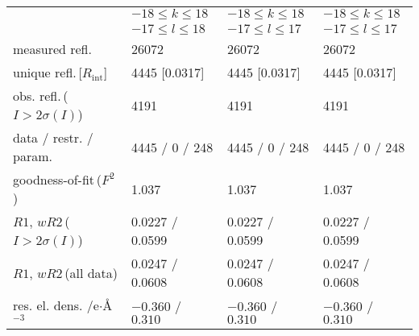 \documentclass[a4paper,landscape]{scrartcl}
\begin{document}
\begin{table}[ht]
\begin{tabular}{llll}
 & $-18\leq k \leq18$ & $-18\leq k \leq18$ & $-18\leq k \leq18$ \\
 & $-17\leq l \leq18$ & $-17\leq l \leq17$ & $-17\leq l \leq17$ \\
measured refl. & 26072 & 26072 & 26072 \\
unique refl.\,[$R_\mathrm {int}$] & 4445 [0.0317] & 4445 [0.0317] & 4445 [0.0317] \\
obs. refl.\,($I > 2\sigma (I)$) & 4191 & 4191 & 4191 \\
data / restr. / param. & 4445 / 0 / 248 & 4445 / 0 / 248 & 4445 / 0 / 248 \\
goodness-of-fit\,($F^2$) & 1.037 & 1.037 & 1.037 \\
$R1$, $wR2$\,($I > 2\sigma (I)$) & 0.0227 / 0.0599 & 0.0227 / 0.0599 & 0.0227 / 0.0599 \\
$R1$, $wR2$\,(all data) & 0.0247 / 0.0608 & 0.0247 / 0.0608 & 0.0247 / 0.0608 \\
res. el. dens. /e$\cdot$\r{A}$^{-3}$ & $-0.360$ / $0.310$ & $-0.360$ / $0.310$ & $-0.360$ / $0.310$ \\
\hline
\end{tabular}
\end{table}
\end{document}
